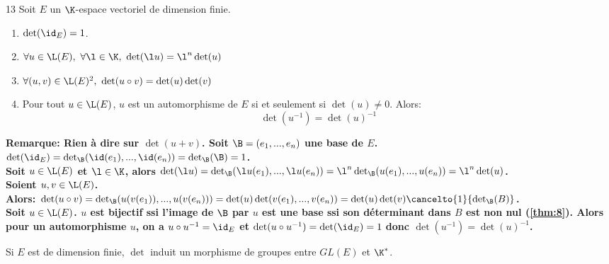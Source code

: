 \documentclass[11pt]{article}
\begin{document}
\begin{prop}{}{13}
    Soit $E$ un $\K$-espace vectoriel de dimension finie.
    \begin{enumerate}[topsep=0pt,itemsep=-0.9 ex]
        \item $\det(\id_E)=1$.
        \item $\forall u \in \L(E), ~ \forall \l \in \K, ~ \det(\l u) = \l^n\det(u)$
        \item $\forall (u,v)\in\L(E)^2, ~ \det(u\circ v)=\det(u)\det(v)$
        \item Pour tout $u\in\L(E)$, $u$ est un automorphisme de $E$ si et seulement si $\det(u)\neq 0$. Alors:
        \begin{equation*}
            \det(u^{-1})=\det(u)^{-1}
        \end{equation*}
    \end{enumerate}
    \bf{Remarque:} Rien à dire sur $\det(u+v)$.
    \tcblower
    Soit $\B=(e_1,...,e_n)$ une base de $E$.\\
     $\det(\id_E)=\det_\B(\id(e_1),...,\id(e_n))=\det_\B(\B)=1$.\\
     Soit $u\in\L(E)$ et $\l\in\K$, alors $\det(\l u) = \det_\B(\l u(e_1),...,\l u(e_n))=\l^n\det_\B(u(e_1),...,u(e_n))=\l^n\det(u)$.\\
     Soient $u,v\in\L(E)$.\\
    Alors: $\det(u\circ v) = \det_\B(u(v(e_1)),...,u(v(e_n)))=\det(u)\det(v(e_1),...,v(e_n))=\det(u)\det(v)\cancelto{1}{\det_\B(B)}$.\\
     Soit $u\in\L(E)$. $u$ est bijectif ssi l'image de $\B$ par $u$ est une base ssi son déterminant dans $B$ est non nul (\ref{thm:8}).
    Alors pour un automorphisme $u$, on a $u\circ u^{-1}=\id_E$ et $\det(u\circ u^{-1})=\det(\id_E)=1$ donc $\det(u^{-1})=\det(u)^{-1}$. 
\end{prop}

\begin{corr}{}{}
    Si $E$ est de dimension finie, $\det$ induit un morphisme de groupes entre $GL(E)$ et $\K^*$.
\end{corr}
\end{document}
